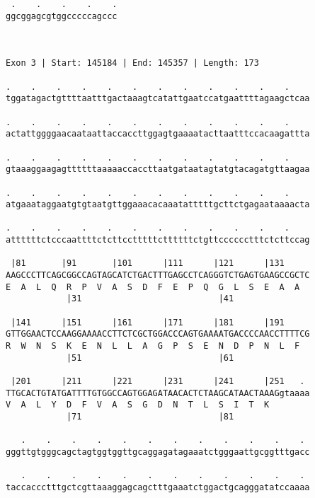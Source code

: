 \documentclass{article}
\begin{document}
\begin{Verbatim}
 .    .    .    .    .
ggcggagcgtggcccccagccc
                      
                      
 
Exon 3 | Start: 145184 | End: 145357 | Length: 173
 
.    .    .    .    .    .    .    .    .    .    .    .    
tggatagactgttttaatttgactaaagtcatattgaatccatgaattttagaagctcaa
                                                            
.    .    .    .    .    .    .    .    .    .    .    .    
actattggggaacaataattaccaccttggagtgaaaatacttaatttccacaagattta
                                                            
.    .    .    .    .    .    .    .    .    .    .    .    
gtaaaggaagagttttttaaaaaccaccttaatgataatagtatgtacagatgttaagaa
                                                            
.    .    .    .    .    .    .    .    .    .    .    .    
atgaaataggaatgtgtaatgttggaaacacaaatatttttgcttctgagaataaaacta
                                                            
.    .    .    .    .    .    .    .    .    .    .    .    
attttttctcccaattttctcttcctttttcttttttctgttcccccctttctcttccag
                                                            
 |81       |91       |101      |111      |121      |131     
AAGCCCTTCAGCGGCCAGTAGCATCTGACTTTGAGCCTCAGGGTCTGAGTGAAGCCGCTC
E  A  L  Q  R  P  V  A  S  D  F  E  P  Q  G  L  S  E  A  A  
            |31                           |41               
  
 |141      |151      |161      |171      |181      |191     
GTTGGAACTCCAAGGAAAACCTTCTCGCTGGACCCAGTGAAAATGACCCCAACCTTTTCG
R  W  N  S  K  E  N  L  L  A  G  P  S  E  N  D  P  N  L  F  
            |51                           |61               
  
 |201      |211      |221      |231      |241      |251   . 
TTGCACTGTATGATTTTGTGGCCAGTGGAGATAACACTCTAAGCATAACTAAAGgtaaaa
V  A  L  Y  D  F  V  A  S  G  D  N  T  L  S  I  T  K        
            |71                           |81               
  
   .    .    .    .    .    .    .    .    .    .    .    . 
gggttgtgggcagctagtggtggttgcaggagatagaaatctgggaattgcggtttgacc
                                                            
   .    .    .    .    .    .    .    .    .    .    .    . 
taccaccctttgctcgttaaaggagcagctttgaaatctggactgcagggatatccaaaa
                                                            

\end{Verbatim}
\end{document}
